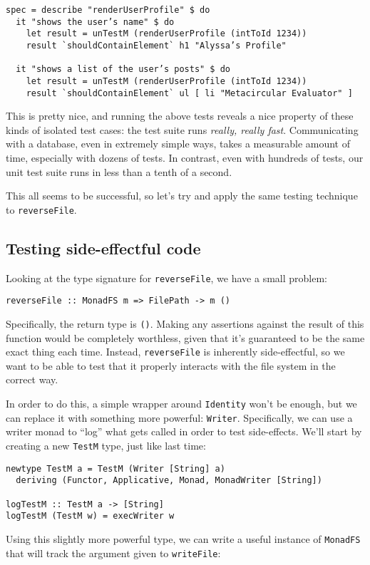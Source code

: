 \begin{verbatim}
spec = describe "renderUserProfile" $ do
  it "shows the user’s name" $ do
    let result = unTestM (renderUserProfile (intToId 1234))
    result `shouldContainElement` h1 "Alyssa’s Profile"

  it "shows a list of the user’s posts" $ do
    let result = unTestM (renderUserProfile (intToId 1234))
    result `shouldContainElement` ul [ li "Metacircular Evaluator" ]
\end{verbatim}
This is pretty nice, and running the above tests reveals a nice property
of these kinds of isolated test cases: the test suite runs \emph{really,
really fast}. Communicating with a database, even in extremely simple
ways, takes a measurable amount of time, especially with dozens of
tests. In contrast, even with hundreds of tests, our unit test suite
runs in less than a tenth of a second.

This all seems to be successful, so let's try and apply the same testing
technique to \texttt{reverseFile}.

\subsection{Testing side-effectful
code}
\label{testing-side-effectful-code}

Looking at the type signature for \texttt{reverseFile}, we have a small
problem:

\begin{verbatim}
reverseFile :: MonadFS m => FilePath -> m ()
\end{verbatim}
Specifically, the return type is \texttt{()}. Making any assertions
against the result of this function would be completely worthless, given
that it's guaranteed to be the same exact thing each time. Instead,
\texttt{reverseFile} is inherently side-effectful, so we want to be able
to test that it properly interacts with the file system in the correct
way.

In order to do this, a simple wrapper around \texttt{Identity} won't be
enough, but we can replace it with something more powerful:
\texttt{Writer}. Specifically, we can use a writer monad to ``log'' what
gets called in order to test side-effects. We'll start by creating a new
\texttt{TestM} type, just like last time:

\begin{verbatim}
newtype TestM a = TestM (Writer [String] a)
  deriving (Functor, Applicative, Monad, MonadWriter [String])

logTestM :: TestM a -> [String]
logTestM (TestM w) = execWriter w
\end{verbatim}
Using this slightly more powerful type, we can write a useful instance
of \texttt{MonadFS} that will track the argument given to
\texttt{writeFile}:

